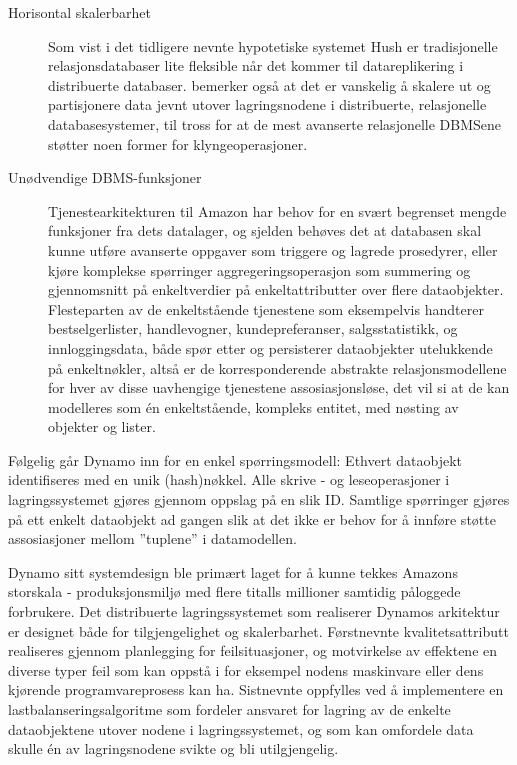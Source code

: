 \begin{description}
  \item [Horisontal skalerbarhet] Som vist i det tidligere nevnte hypotetiske systemet Hush \citep{george2011} er tradisjonelle relasjonsdatabaser lite fleksible når det kommer til datareplikering i distribuerte databaser. \cite{decandia2007} bemerker også at det er vanskelig å skalere ut og partisjonere data jevnt utover lagringsnodene i distribuerte, relasjonelle databasesystemer, til tross for at de mest avanserte relasjonelle DBMSene støtter noen former for klyngeoperasjoner.
  \item [Unødvendige DBMS-funksjoner] Tjenestearkitekturen til Amazon har behov for en svært begrenset mengde funksjoner fra dets datalager, og sjelden behøves det at databasen skal kunne utføre avanserte oppgaver som triggere og lagrede prosedyrer, eller kjøre komplekse spørringer aggregeringsoperasjon som summering og gjennomsnitt på enkeltverdier på enkeltattributter over flere dataobjekter. Flesteparten av de enkeltstående tjenestene som eksempelvis handterer bestselgerlister, handlevogner, kundepreferanser, salgsstatistikk, og innloggingsdata, både spør etter og persisterer dataobjekter utelukkende på enkeltnøkler, altså er de korresponderende abstrakte relasjonsmodellene for hver av disse uavhengige tjenestene assosiasjonsløse, det vil si at de kan modelleres som én enkeltstående, kompleks entitet, med nøsting av objekter og lister.
\end{description}

Følgelig går Dynamo inn for en enkel spørringsmodell: Ethvert dataobjekt identifiseres med en unik (hash)nøkkel. Alle skrive - og leseoperasjoner i lagringssystemet gjøres gjennom oppslag på en slik ID. Samtlige spørringer gjøres på ett enkelt dataobjekt ad gangen slik at det ikke er behov for å innføre støtte assosiasjoner mellom ''tuplene'' i datamodellen.  %

Dynamo sitt systemdesign ble primært laget for å kunne tekkes Amazons storskala - produksjonsmiljø med flere titalls millioner samtidig påloggede forbrukere. Det distribuerte lagringssystemet som realiserer Dynamos arkitektur er designet både for tilgjengelighet og skalerbarhet. Førstnevnte kvalitetsattributt realiseres gjennom planlegging for feilsituasjoner, og motvirkelse av effektene en diverse typer feil som kan oppstå i for eksempel nodens maskinvare eller dens kjørende programvareprosess kan ha. Sistnevnte oppfylles ved å implementere en lastbalanseringsalgoritme som fordeler ansvaret for lagring av de enkelte dataobjektene utover nodene i lagringssystemet, og som kan omfordele data skulle én av lagringsnodene svikte og bli utilgjengelig.

